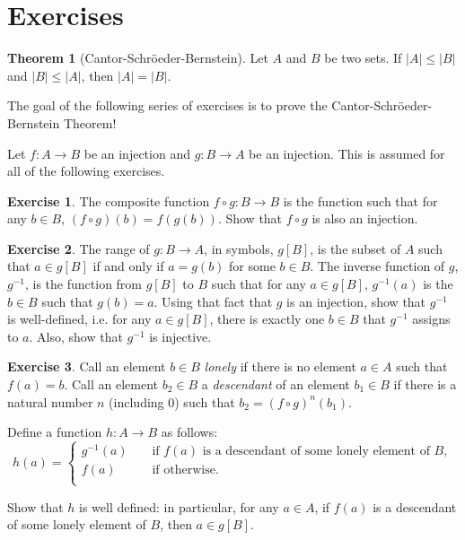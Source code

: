\documentclass[11pt]{article}
\theoremstyle{definition}
\newtheorem{exer}{Exercise}
\newtheorem{theorem}{Theorem}[section]
\begin{document}
\section{Exercises}

\begin{theorem} [Cantor-Schr\"{o}eder-Bernstein]
Let $A$ and $B$ be two sets. If $|A| \leqslant |B|$ and $|B| \leqslant |A|$, then $|A| = |B|$.
\end{theorem}

The goal of the following series of exercises is to prove the Cantor-Schr\"{o}eder-Bernstein Theorem! 

Let $f: A \rightarrow B$ be an injection and $g: B \rightarrow A$ be an injection. This is assumed for all of the following exercises.

\begin{exer}
The composite function $f \circ g: B \rightarrow B$ is the function such that for any $b \in B$, $(f \circ g)(b) = f(g(b))$. Show that $f \circ g$ is also an injection.
\end{exer}

\begin{exer}
The range of $g: B \rightarrow A$, in symbols, $g[B]$, is the subset of $A$ such that $a \in g[B]$ if and only if $a = g(b)$ for some $b \in B$. The inverse function of $g$, $g^{-1}$, is the function from $g[B]$ to $B$ such that for any $a \in g[B]$, $g^{-1}(a)$ is the $b \in B$ such that $g(b) = a$. Using that fact that $g$ is an injection, show that $g^{-1}$ is well-defined, i.e. for any $a \in g[B]$, there is exactly one $b \in B$ that $g^{-1}$ assigns to $a$. Also, show that $g^{-1}$ is injective.
\end{exer}

\begin{exer}
Call an element $b \in B$ \textit{lonely} if there is no element $a \in A$ such that $f(a) = b$. Call an element $b_2 \in B$ a \textit{descendant} of an element $b_1 \in B$ if there is a natural number $n$ (including $0$) such that $b_2 = (f \circ g)^n (b_1)$.

Define a function $h: A \rightarrow B$ as follows:
\[
h(a) = 
\begin{cases}
g^{-1}(a) \; \; \; \; & \text{if} \, \, f(a) \, \, \text{is a descendant of some lonely element of} \, \, B, \\
f(a) \; \; \; \; & \text{if otherwise}. \\
\end{cases}
\]

Show that $h$ is well defined: in particular, for any $a \in A$, if $f(a)$ is a descendant of some lonely element of $B$, then $a \in g[B]$.
\end{exer}
\end{document}
